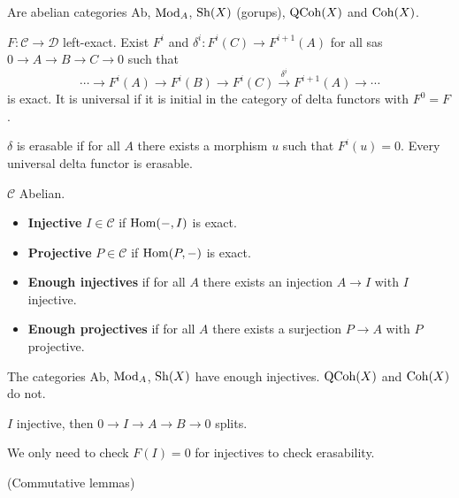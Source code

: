 \begin{proposition} Are abelian categories Ab, $\operatorname{Mod}_A$, $\operatorname{Sh}(X)$ (gorups), $\operatorname{QCoh}(X)$ and $\operatorname{Coh}(X)$.
\end{proposition}

\begin{definition} $F: \mathcal{C} \to \mathcal{D}$ left-exact. Exist $F^i$ and $\delta ^i : F^i(C) \to F^{i+1}(A)$ for all sas $0 \to A \to B \to C \to 0$ such that
\[
\cdots \to F^i(A) \to F^i(B) \to F^i(C) \xrightarrow{\delta^i} F^{i+1}(A) \to \cdots
\]
is exact. It is universal if it is initial in the category of delta functors with $F^0 = F$.
\end{definition}

\begin{definition}[Erasable] $\delta $ is erasable if for all $A$ there exists a morphism $u$ such that $F^i(u) = 0$. Every universal delta functor is erasable.
\end{definition}

\begin{definition} $\mathcal{C}$ Abelian.
\begin{itemize}[topsep=-6pt, itemsep=0pt]
    \item \textbf{Injective} $I \in \mathcal{C}$ if $\operatorname{Hom}(-, I)$ is exact.
    \item \textbf{Projective} $P \in \mathcal{C}$ if $\operatorname{Hom}(P, -)$ is exact.
    \item \textbf{Enough injectives} if for all $A$ there exists an injection $A \to I$ with $I$ injective.
    \item \textbf{Enough projectives} if for all $A$ there exists a surjection $P \to A$ with $P$ projective.
\end{itemize}
\end{definition}

\begin{proposition} The categories Ab, $\operatorname{Mod}_A$, $\operatorname{Sh}(X)$ have enough injectives. $\operatorname{QCoh}(X)$ and $\operatorname{Coh}(X)$ do not.
\end{proposition}

\begin{proposition} $I$ injective, then $ 0 \to I \to  A \to B \to 0$ splits.
\end{proposition}

\begin{proposition}
We only need to check $F(I)=0$ for injectives to check erasability.
\end{proposition}

(Commutative lemmas)

